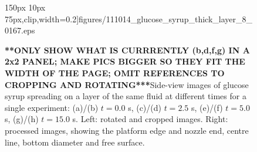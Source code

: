 \documentclass[aip,graphicx]{revtex4-1}
\begin{document}
\begin{figure}[!ht]
{{       150px 10px
       75px},clip,width=0.2\textwidth]{figures/111014_glucose_syrup_thick_layer_8_0167.eps}} \hspace{0.5cm}
 \\  \hspace{0.5cm}
  \caption{{\bf ***ONLY SHOW WHAT IS CURRRENTLY (b,d,f,g) IN A 2x2
      PANEL; MAKE PICS BIGGER SO THEY FIT THE WIDTH OF THE PAGE; OMIT
      REFERENCES TO CROPPING AND ROTATING***}Side-view images of glucose syrup spreading on a layer of
    the same fluid at different times for a single experiment: (a)/(b)
    $t=0.0$ s, (c)/(d) $t=2.5$ s, (e)/(f) $t=5.0$ s, (g)/(h) $t=15.0$
    s. Left: rotated and cropped images. Right: processed images,
    showing the platform edge and nozzle end, centre line, bottom
    diameter and free surface.\label{fig:glucose_spreading}}
\end{figure}
\end{document}
